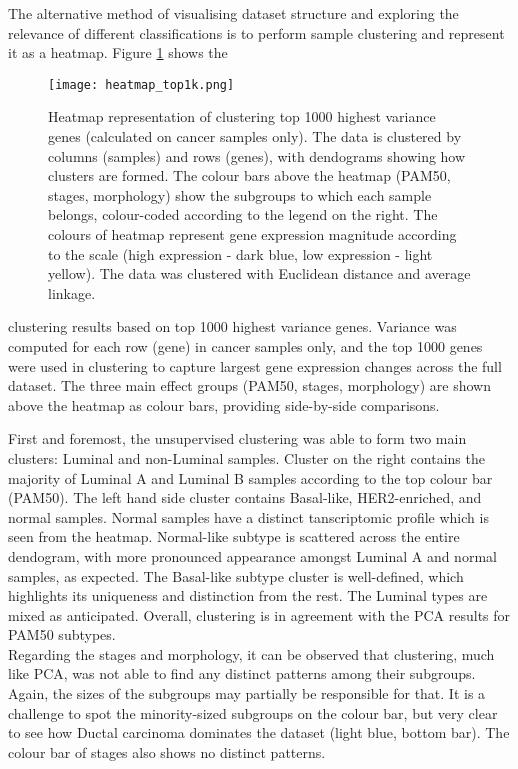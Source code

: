     The alternative method of visualising dataset structure and exploring the relevance of different classifications is to perform sample clustering and represent it as a heatmap. Figure \ref{fig:heatmap1k} shows the
    
            \begin{figure}[!h]
            \centering
            \texttt{[image: heatmap\_top1k.png]}
            \caption[Heatmap clustering of top genes with highest variance]{Heatmap representation of clustering top 1000 highest variance genes (calculated on cancer samples only). The data is clustered by columns (samples) and rows (genes), with dendograms showing how clusters are formed. The colour bars above the heatmap (PAM50, stages, morphology) show the subgroups to which each sample belongs, colour-coded according to the legend on the right. The colours of heatmap represent gene expression magnitude according to the scale (high expression - dark blue, low expression - light yellow). The data was clustered with Euclidean distance and average linkage. }
            \label{fig:heatmap1k}
            \end{figure}
            
   clustering results based on top 1000 highest variance genes. Variance was computed for each row (gene) in cancer samples only, and the top 1000 genes were used in clustering to capture largest gene expression changes across the full dataset. The three main effect groups (PAM50, stages, morphology) are shown above the heatmap as colour bars, providing side-by-side comparisons.     
   
    First and foremost, the unsupervised clustering was able to form two main clusters: Luminal and non-Luminal samples. Cluster on the right contains the majority of Luminal A and Luminal B samples according to the top colour bar (PAM50). The left hand side cluster contains Basal-like, HER2-enriched, and normal samples. Normal samples have a distinct tanscriptomic profile which is seen from the heatmap. Normal-like subtype is scattered across the entire dendogram, with more pronounced appearance amongst Luminal A and normal samples, as expected. The Basal-like subtype cluster is well-defined, which highlights its uniqueness and distinction from the rest. The Luminal types are mixed as anticipated. Overall, clustering is in agreement with the PCA results for PAM50 subtypes. \\    
    Regarding the stages and morphology, it can be observed that clustering, much like PCA, was not able to find any distinct patterns among their subgroups. Again, the sizes of the subgroups may partially be responsible for that. It is a challenge to spot the minority-sized subgroups on the colour bar, but very clear to see how Ductal carcinoma dominates the dataset (light blue, bottom bar). The colour bar of stages also shows no distinct patterns. \\ 
    \newline
    

